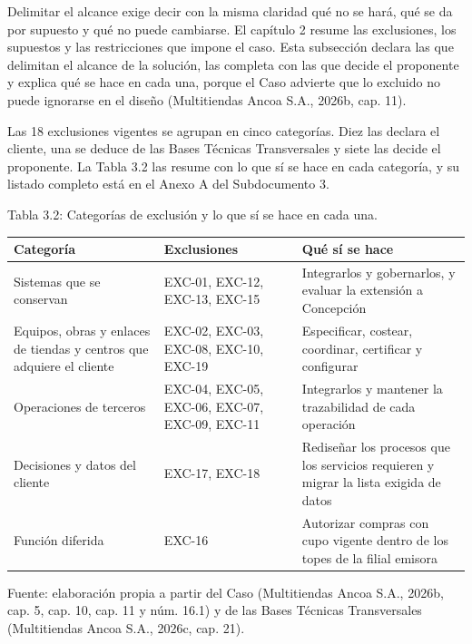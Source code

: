 \documentclass[11pt]{article}
\begin{document}
Delimitar el alcance exige decir con la misma claridad qué no se hará, qué se da por supuesto y qué no puede cambiarse. El capítulo 2 resume las exclusiones, los supuestos y las restricciones que impone el caso. Esta subsección declara las que delimitan el alcance de la solución, las completa con las que decide el proponente y explica qué se hace en cada una, porque el Caso advierte que lo excluido no puede ignorarse en el diseño (Multitiendas Ancoa S.A., 2026b, cap. 11).

Las 18 exclusiones vigentes se agrupan en cinco categorías. Diez las declara el cliente, una se deduce de las Bases Técnicas Transversales y siete las decide el proponente. La Tabla 3.2 las resume con lo que sí se hace en cada categoría, y su listado completo está en el Anexo A del Subdocumento 3.

Tabla 3.2: Categorías de exclusión y lo que sí se hace en cada una.

\begin{longtable}[]{@{}
  >{\raggedright\arraybackslash}p{}
  >{\raggedright\arraybackslash}p{}
  >{\raggedright\arraybackslash}p{}@{}}
\toprule\noalign{}
Categoría & Exclusiones & Qué sí se hace \\
\midrule\noalign{}
\endhead
\bottomrule\noalign{}
\endlastfoot
Sistemas que se conservan & EXC-01, EXC-12, EXC-13, EXC-15 & Integrarlos y gobernarlos, y evaluar la extensión a Concepción \\
Equipos, obras y enlaces de tiendas y centros que adquiere el cliente & EXC-02, EXC-03, EXC-08, EXC-10, EXC-19 & Especificar, costear, coordinar, certificar y configurar \\
Operaciones de terceros & EXC-04, EXC-05, EXC-06, EXC-07, EXC-09, EXC-11 & Integrarlos y mantener la trazabilidad de cada operación \\
Decisiones y datos del cliente & EXC-17, EXC-18 & Rediseñar los procesos que los servicios requieren y migrar la lista exigida de datos \\
Función diferida & EXC-16 & Autorizar compras con cupo vigente dentro de los topes de la filial emisora \\
\end{longtable}

Fuente: elaboración propia a partir del Caso (Multitiendas Ancoa S.A., 2026b, cap. 5, cap. 10, cap. 11 y núm. 16.1) y de las Bases Técnicas Transversales (Multitiendas Ancoa S.A., 2026c, cap. 21).
\end{document}
